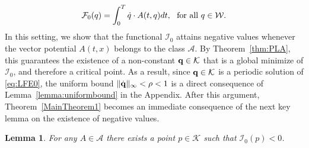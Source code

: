 \documentclass{article}
\newcommand{\boK}{\mathcal{K}}
\newcommand{\boI}{\mathcal{I}}
\newcommand{\boW}{\mathcal{W}}
\newcommand{\boF}{\mathcal{F}}
\newcommand{\boA}{\mathcal{A}}
\newcommand{\dq}{\dot{q}}
\newtheorem{lemma}{Lemma}[section]
\theoremstyle{definition}
\begin{document}
 \begin{align}\label{eq:F0}
    \boF_0(q)=\int_0^T \dq\cdot A(t,q) dt,\ \hbox{ for all }q\in\boW.
\end{align}
In this setting, we show that the functional $\boI_0$ attains negative values whenever the vector potential $A(t,x)$ belongs to the class $\boA$. By Theorem~\ref{thm:PLA}, this guarantees the existence of a non-constant ${\bf q}\in\boK$ that is a global minimize of $\boI_0$, and therefore a critical point. As a result, since ${\bf q}\in\boK$ is a periodic solution of \eqref{eq:LFE0}, the uniform bound $\|\dot{\bf q}\|_\infty<\rho<1$ is a direct consequence of Lemma~\ref{lemma:uniformbound} in the Appendix. After this argument, Theorem~\ref{MainTheorem1} becomes an immediate consequence of the next key lemma on the existence of negative values.
\begin{lemma}\label{lemma:negative}
For any $A\in\boA$ there exists a point $p\in\boK$ such that $\boI_0(p)<0$.
\end{lemma}
\end{document}
